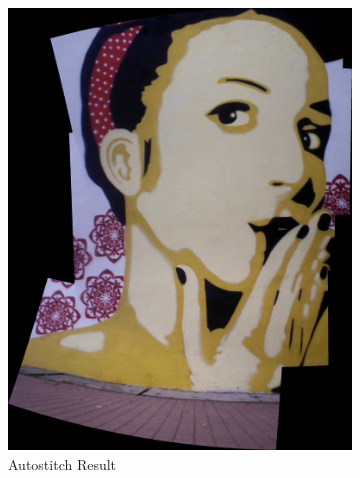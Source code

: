 \begin{figure}
\centering
\begin{subfigure}[b]{0.3\textwidth}
\centering
\includegraphics[width=\linewidth]{figures/sac3/autostitch.jpg}
\caption{Autostitch Result}
\end{subfigure}
\begin{subfigure}[b]{0.3\textwidth}
\centering

\end{subfigure}
\end{figure}
